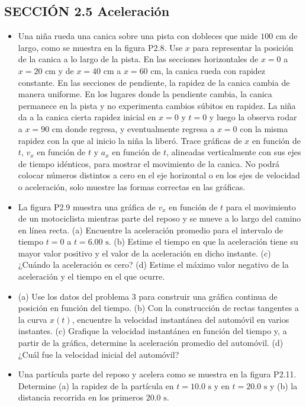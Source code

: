 \documentclass[11pt,a4paper]{article}
\begin{document}
\newpage

\subsection*{SECCIÓN 2.5 Aceleración}

\begin{itemize}
    \item[\textbf{8.}] Una niña rueda una canica sobre una pista con dobleces que mide $100 \text{ cm}$ de largo, como se muestra en la figura P2.8. Use $x$ para representar la posición de la canica a lo largo de la pista. En las secciones horizontales de $x = 0$ a $x = 20 \text{ cm}$ y de $x = 40 \text{ cm}$ a $x = 60 \text{ cm}$, la canica rueda con rapidez constante. En las secciones de pendiente, la rapidez de la canica cambia de manera uniforme. En los lugares donde la pendiente cambia, la canica permanece en la pista y no experimenta cambios súbitos en rapidez. La niña da a la canica cierta rapidez inicial en $x = 0$ y $t = 0$ y luego la observa rodar a $x = 90 \text{ cm}$ donde regresa, y eventualmente regresa a $x = 0$ con la misma rapidez con la que al inicio la niña la liberó. Trace gráficas de $x$ en función de $t$, $v_x$ en función de $t$ y $a_x$ en función de $t$, alineadas verticalmente con sus ejes de tiempo idénticos, para mostrar el movimiento de la canica. No podrá colocar números distintos a cero en el eje horizontal o en los ejes de velocidad o aceleración, solo muestre las formas correctas en las gráficas.
    \vspace*{10cm}

    \item[\textbf{9.}] La figura P2.9 muestra una gráfica de $v_x$ en función de $t$ para el movimiento de un motociclista mientras parte del reposo y se mueve a lo largo del camino en línea recta. (a) Encuentre la aceleración promedio para el intervalo de tiempo $t = 0$ a $t = 6.00 \text{ s}$. (b) Estime el tiempo en que la aceleración tiene su mayor valor positivo y el valor de la aceleración en dicho instante. (c) ¿Cuándo la aceleración es cero? (d) Estime el máximo valor negativo de la aceleración y el tiempo en el que ocurre.
    \vspace*{7cm}

    \item[\textbf{10.}] (a) Use los datos del problema 3 para construir una gráfica continua de posición en función del tiempo. (b) Con la construcción de rectas tangentes a la curva $x(t)$, encuentre la velocidad instantánea del automóvil en varios instantes. (c) Grafique la velocidad instantánea en función del tiempo y, a partir de la gráfica, determine la aceleración promedio del automóvil. (d) ¿Cuál fue la velocidad inicial del automóvil?
    \vspace*{10cm}

    \item[\textbf{11.}] Una partícula parte del reposo y acelera como se muestra en la figura P2.11. Determine (a) la rapidez de la partícula en $t = 10.0 \text{ s}$ y en $t = 20.0 \text{ s}$ y (b) la distancia recorrida en los primeros $20.0 \text{ s}$.
    \vspace*{7cm}
\end{itemize}
\end{document}
